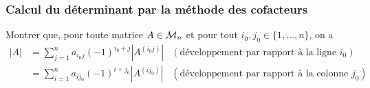 \subsubsection{Calcul du déterminant par la méthode des cofacteurs}

  Montrer que, pour toute matrice $A \in \mathcal{M}_n$ et pour tout $i_0, j_0 \in \{1, \dots, n\}$, on a 
  \begin{align*}
    |A| 
    & = \sum_{j=1}^n a_{i_0j} (-1)^{i_0+j} |A^{(i_0j)}| & (\text{développement par rapport à la ligne $i_0$}) \\
    & = \sum_{i=1}^n a_{ij_0} (-1)^{i+j_0} |A^{(ij_0)}| & (\text{développement par rapport à la colonne $j_0$})
  \end{align*}

